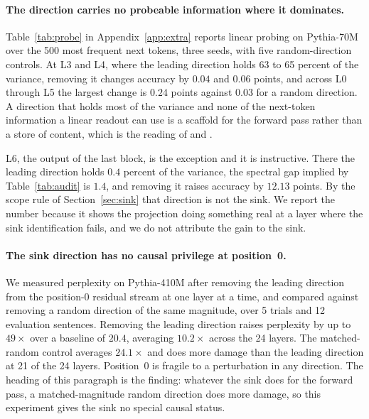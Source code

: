 \documentclass{article}
\theoremstyle{spaced}
\theoremstyle{definition}
\begin{document}
\paragraph{The direction carries no probeable information where it dominates.} Table~\ref{tab:probe} in Appendix~\ref{app:extra} reports linear probing on Pythia-70M over the 500 most frequent next tokens, three seeds, with five random-direction controls. At L3 and L4, where the leading direction holds 63 to 65 percent of the variance, removing it changes accuracy by $0.04$ and $0.06$ points, and across L0 through L5 the largest change is $0.24$ points against $0.03$ for a random direction. A direction that holds most of the variance and none of the next-token information a linear readout can use is a scaffold for the forward pass rather than a store of content, which is the reading of \citet{barbero2025first} and \citet{zhang2025catch}.

L6, the output of the last block, is the exception and it is instructive. There the leading direction holds $0.4$ percent of the variance, the spectral gap implied by Table~\ref{tab:audit} is $1.4$, and removing it raises accuracy by $12.13$ points. By the scope rule of Section~\ref{sec:sink} that direction is not the sink. We report the number because it shows the projection doing something real at a layer where the sink identification fails, and we do not attribute the gain to the sink.

\paragraph{The sink direction has no causal privilege at position~0.} We measured perplexity on Pythia-410M after removing the leading direction from the position-0 residual stream at one layer at a time, and compared against removing a random direction of the same magnitude, over 5 trials and 12 evaluation sentences. Removing the leading direction raises perplexity by up to $49\times$ over a baseline of $20.4$, averaging $10.2\times$ across the 24 layers. The matched-random control averages $24.1\times$ and does more damage than the leading direction at 21 of the 24 layers. Position~0 is fragile to a perturbation in any direction. The heading of this paragraph is the finding: whatever the sink does for the forward pass, a matched-magnitude random direction does more damage, so this experiment gives the sink no special causal status.
\end{document}

